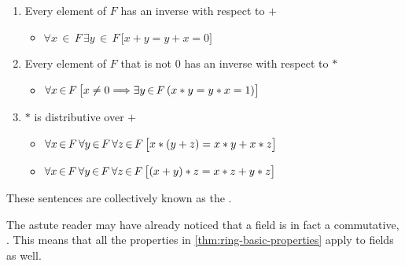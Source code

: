 \begin{dfn}
\begin{enumerate}[topsep=2pt,noitemsep,label=\textup{\texttt{(\alph*)}}]
\begin{itemize}
                        \,\,{\land}\,\,
                        \forall x\,{\in}\,F \, \big( x \ast j = j \ast x = x \big)
                    \big] \)
            \end{itemize}
        \item Every element of \( F \) has an inverse with respect to \( + \)  \label{enum:field-inverse-with-respect-to-plus}
            \begin{itemize}
                \item \( \forall x\,{\in}\,F \, \exists y\,{\in}\,F \, \big[ x + y = y + x = 0 \big] \)
            \end{itemize}
        \item Every element of \( F \) that is not \( 0 \) has an inverse with respect to \( \ast \)  \label{enum:field-inverse-with-respect-to-star-non-zero}
            \begin{itemize}
                \item \( \forall x\,{\in}\,F \, \big[ x \neq 0 {\implies} \exists y\,{\in}\,F \, \mleft( x \ast y = y \ast x = 1 \mright) \big] \)
            \end{itemize}
        \item \( \ast \) is distributive over \( + \)  \label{enum:field-star-distributes-over-plus}
            \begin{itemize}
                \setlength{\itemsep}{0.2em}
                \item \( \forall x\,{\in}\,F \, \forall y\,{\in}\,F \, \forall z\,{\in}\,F \, \big[ x \ast \mleft( y + z \mright) = x \ast y + x \ast z \big] \)
                \item \( \forall x\,{\in}\,F \, \forall y\,{\in}\,F \, \forall z\,{\in}\,F \, \big[ \mleft( x + y \mright) \ast z = x \ast z + y \ast z \big] \)
            \end{itemize}
    \end{enumerate}
    These sentences  are collectively known as the .
\end{dfn}

\begin{rem}
    The astute reader may have already noticed that a field is in fact a commutative, .
    This means that all the properties in \cref{thm:ring-basic-properties} apply to fields as well.
\end{rem}

